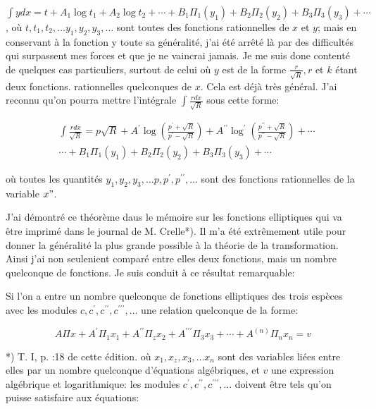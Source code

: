 \documentclass{article}
\begin{document}
\(\int y d x=t+A_{1} \log t_{1}+A_{2} \log t_{2}+\cdots+B_{1} \Pi_{1}\left(y_{1}\right)+B_{2} \Pi_{2}\left(y_{2}\right)+B_{3} \Pi_{3}\left(y_{3}\right)+\cdots\), où \(t, t_{1}, t_{2}, \ldots y_{1}, y_{2}, y_{3}, \ldots\) sont toutes des fonctions rationnelles de \(x\) et \(y\); mais en conservant à la fonction y toute sa généralité, j'ai été arrêté là par des difficultés qui surpassent mes forces et que je ne vaincrai jamais. Je me suis done contenté de quelques cas particuliers, surtout de celui où \(y\) est de la forme \(\frac{r}{\sqrt{R}}, r\) et \(k\) étant deux fonctions. rationnelles quelconques de \(x\). Cela est déjà très général. J'ai reconnu qu'on pourra mettre l'intégrale \(\int \frac{r d x}{\sqrt{R}}\) sous cette forme:

\[
\begin{aligned}
& \int \frac{r d x}{\sqrt{R}}=p \sqrt{R}+A^{\prime} \log \left(\frac{p^{\prime}+\sqrt{R}}{p^{\prime}-\sqrt{R}}\right)+A^{\prime \prime} \log ^{\prime}\left(\frac{p^{\prime \prime}+\sqrt{R}}{p^{\prime \prime}-\sqrt{R}}\right)+\cdots \\
& \cdots+B_{1} \Pi_{1}\left(y_{1}\right)+B_{2} \Pi_{2}\left(y_{2}\right)+B_{3} \Pi_{3}\left(y_{3}\right)+\cdots
\end{aligned}
\]

où toutes les quantités \(y_{1}, y_{2}, y_{3}, \ldots p, p^{\prime}, p^{\prime \prime}, \ldots\) sont des fonctions rationnelles de la variable \(x "\).

J'ai démontré ce théorème daus le mémoire sur les fonctions elliptiques qui va être imprimé dans le journal de M. Crelle*). Il m'a été extrêmement utile pour donner la généralité la plus grande possible à la théorie de la transformation. Ainsi j'ai non seulenient comparé entre elles deux fonctions, mais un nombre quelconque de fonctions. Je suis conduit à ce résultat remarquable:

Si l'on a entre un nombre quelconque de fonctions elliptiques des trois espèces avec les modules \(c, c^{\prime}, c^{\prime \prime}, c^{\prime \prime \prime}, \ldots\) une relation quelconque de la forme:

\[
A \Pi x+A^{\prime} \Pi_{1} x_{1}+A^{\prime \prime} \Pi_{z} x_{2}+A^{\prime \prime \prime} \Pi_{3} x_{3}+\cdots+A^{(n)} \Pi_{n} x_{n}=v
\]

*) T. I, p. :18 de cette édition.
où \(x_{1}, x_{z}, x_{3}, \ldots x_{n}\) sont des variables liées entre elles par un nombre quelconque d'équations algébriques, et \(v\) une expression algébrique et logarithmique: les modules \(c^{\prime}, c^{\prime \prime}, c^{\prime \prime \prime}, \ldots\) doivent être tels qu'on puisse satisfaire aux équations:
\end{document}
